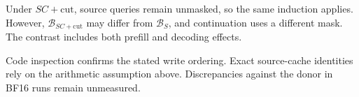 Under $SC+\mathrm{cut}$, source queries remain unmasked, so the same
induction applies. However, $\mathcal B_{SC+\mathrm{cut}}$ may differ
from $\mathcal B_S$, and continuation uses a different mask. The contrast
includes both prefill and decoding effects.

Code inspection confirms the stated write ordering. Exact source-cache
identities rely on the arithmetic assumption above. Discrepancies against
the donor in BF16 runs remain unmeasured.


